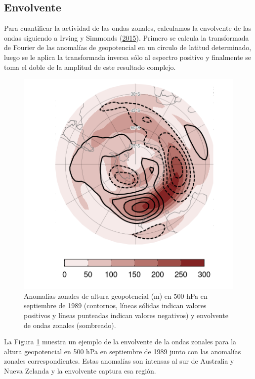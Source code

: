 \documentclass[12pt,oneside,a4paper]{reedthesis}
\begin{document}
\hypertarget{envolvente}{%
\subsection{Envolvente}\label{envolvente}}

Para cuantificar la actividad de las ondas zonales, calculamos la envolvente de las ondas siguiendo a Irving y Simmonds (\protect\hyperlink{ref-irving2015}{2015}).
Primero se calcula la transformada de Fourier de las anomalías de geopotencial en un círculo de latitud determinado, luego se le aplica la transformada inversa sólo al espectro positivo y finalmente se toma el doble de la amplitud de este resultado complejo.

\begin{figure}

{\centering \includegraphics{figures/15-onda3/envolvente-ejemplo-1} 

}

\caption{Anomalías zonales de altura geopotencial (m) en 500 hPa en septiembre de 1989 (contornos, líneas sólidas indican valores positivos y líneas punteadas indican valores negativos) y envolvente de ondas zonales (sombreado).}\label{fig:envolvente-ejemplo}
\end{figure}



La Figura \ref{fig:envolvente-ejemplo} muestra un ejemplo de la envolvente de la ondas zonales para la altura geopotencial en 500 hPa en septiembre de 1989 junto con las anomalías zonales correspondientes.
Estas anomalías son intensas al sur de Australia y Nueva Zelanda y la envolvente captura esa región.
\end{document}
